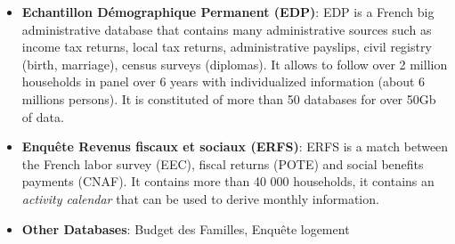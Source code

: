 \documentclass[a4paper,11pt]{article} %
\begin{document}
\begin{itemize}
\item \textbf{Echantillon Démographique Permanent (EDP)}:  EDP is a French big administrative database that contains many administrative sources such as income tax returns, local tax returns, administrative payslips, civil registry (birth, marriage), census surveys (diplomas). It allows to follow over 2 million households in panel over 6 years with individualized information (about 6 millions persons). It is constituted of more than 50 databases for over 50Gb of data.
\item \textbf{Enquête Revenus fiscaux et sociaux (ERFS)}:  ERFS is a match between the French labor survey (EEC), fiscal returns (POTE) and social benefits payments (CNAF). It contains more than 40 000 households, it contains an \emph{activity calendar} that can be used to derive monthly information.

\item \textbf{Other Databases}:  Budget des Familles, Enquête logement
\end{itemize}
\newpage
\end{document}
